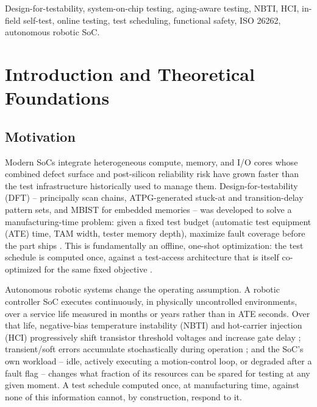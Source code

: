 \documentclass[journal]{IEEEtran}
\begin{document}
\begin{IEEEkeywords}
Design-for-testability, system-on-chip testing, aging-aware testing, NBTI, HCI, in-field self-test, online testing, test scheduling, functional safety, ISO 26262, autonomous robotic SoC.
\end{IEEEkeywords}

\section{Introduction and Theoretical Foundations}
\subsection{Motivation}
Modern SoCs integrate heterogeneous compute, memory, and I/O cores whose combined defect surface and post-silicon reliability risk have grown faster than the test infrastructure historically used to manage them. Design-for-testability (DFT) -- principally scan chains, ATPG-generated stuck-at and transition-delay pattern sets, and MBIST for embedded memories -- was developed to solve a manufacturing-time problem: given a fixed test budget (automatic test equipment (ATE) time, TAM width, tester memory depth), maximize fault coverage before the part ships \cite{r1,r2}. This is fundamentally an offline, one-shot optimization: the test schedule is computed once, against a test-access architecture that is itself co-optimized for the same fixed objective \cite{r3}.

Autonomous robotic systems change the operating assumption. A robotic controller SoC executes continuously, in physically uncontrolled environments, over a service life measured in months or years rather than in ATE seconds. Over that life, negative-bias temperature instability (NBTI) and hot-carrier injection (HCI) progressively shift transistor threshold voltages and increase gate delay \cite{r4,r5,r6,r7}; transient/soft errors accumulate stochastically during operation \cite{r8}; and the SoC's own workload -- idle, actively executing a motion-control loop, or degraded after a fault flag -- changes what fraction of its resources can be spared for testing at any given moment. A test schedule computed once, at manufacturing time, against none of this information cannot, by construction, respond to it.
\end{document}
